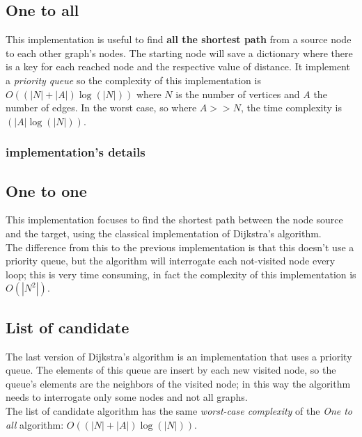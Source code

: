\documentclass[a4paper,12pt]{report}
\begin{document}

\subsection{One to all}
This implementation is useful to find \textbf{all the shortest path} from a source node to each other graph's nodes. The starting node will save a dictionary where there is a key for each reached node and the respective value of distance.
It implement a \textit{priority queue} so the complexity of this implementation is $O((|N|+|A|)\log(|N|))$ where $N$ is the number of vertices and $A$ the number of edges. In the worst case, so where $A>>N$, the time complexity is $(|A|\log(|N|))$.
\subsubsection*{implementation's details}

\subsection{One to one}
This implementation focuses to find the shortest path between the node source and the target, using the classical implementation of Dijkstra's algorithm.\\
The difference from this to the previous implementation is that this doesn't use a priority queue, but the algorithm will interrogate each not-visited node every loop; this is very time consuming, in fact the complexity of this implementation is $O(|N^2|)$.

\subsection{List of candidate}
The last version of Dijkstra's algorithm is an implementation that uses a priority queue. The elements of this queue are insert by each new visited node, so the queue's elements are the neighbors of the visited node; in this way the algorithm needs to interrogate only some nodes and not all graphs.\\
The list of candidate algorithm has the same \textit{worst-case complexity} of the \textit{One to all} algorithm: $O((|N|+|A|)\log(|N|))$.
\end{document}
